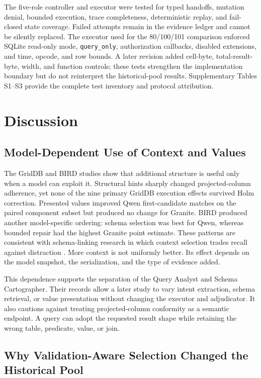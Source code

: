 \documentclass[applsci,article,submit,moreauthors]{Definitions/mdpi}
\begin{document}
The five-role controller and executor were tested for typed handoffs, mutation denial, bounded execution, trace completeness, deterministic replay, and fail-closed state coverage. Failed attempts remain in the evidence ledger and cannot be silently replaced. The executor used for the 80/100/101 comparison enforced SQLite read-only mode, \texttt{query\_only}, authorization callbacks, disabled extensions, and time, opcode, and row bounds. A later revision added cell-byte, total-result-byte, width, and function controls; these tests strengthen the implementation boundary but do not reinterpret the historical-pool results. Supplementary Tables S1--S3 provide the complete test inventory and protocol attribution.

\section{Discussion}

\subsection{Model-Dependent Use of Context and Values}

The GridDB and BIRD studies show that additional structure is useful only when a model can exploit it. Structural hints sharply changed projected-column adherence, yet none of the nine primary GridDB execution effects survived Holm correction. Presented values improved Qwen first-candidate matches on the paired component subset but produced no change for Granite. BIRD produced another model-specific ordering: schema selection was best for Qwen, whereas bounded repair had the highest Granite point estimate. These patterns are consistent with schema-linking research in which context selection trades recall against distraction \cite{bozdemir2026schema,liu2025solidsql,hao2025genlink}. More context is not uniformly better. Its effect depends on the model snapshot, the serialization, and the type of evidence added.

This dependence supports the separation of the Query Analyst and Schema Cartographer. Their records allow a later study to vary intent extraction, schema retrieval, or value presentation without changing the executor and adjudicator. It also cautions against treating projected-column conformity as a semantic endpoint. A query can adopt the requested result shape while retaining the wrong table, predicate, value, or join.

\subsection{Why Validation-Aware Selection Changed the Historical Pool}
\end{document}
